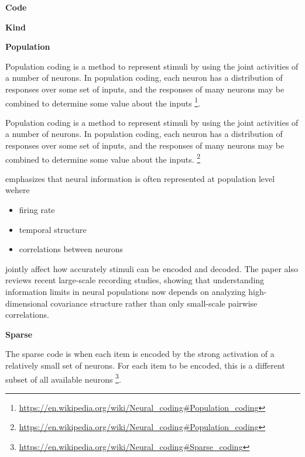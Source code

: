 \documentclass{book}
\providecommand{\ProjectDeepHeading}[2]{%
    \par\medskip\noindent\textbf{#2}\par\smallskip
}
\providecommand{\seeherefooter}[1]{\footnote{\url{#1}}}
\begin{document}
\ProjectDeepHeading{8}{Code}

\ProjectDeepHeading{9}{Kind}

\ProjectDeepHeading{10}{Population}


Population coding is a method to represent stimuli by using the joint activities of a number of neurons. In population coding, each neuron has a distribution of responses over some set of inputs, and the responses of many neurons may be combined to determine some value about the inputs \seeherefooter{https://en.wikipedia.org/wiki/Neural_coding\#Population_coding}.
    
    Population coding is a method to represent stimuli by using the joint activities of a number of neurons. In population coding, each neuron has a distribution of responses over some set of inputs, and the responses of many neurons may be combined to determine some value about the inputs.
    \seeherefooter{https://en.wikipedia.org/wiki/Neural_coding\#Population_coding}
    
    \cite{shimazaki-2025-neural-coding-foundational-concepts-statistical-formulations-and-recent-advances} emphasizes that neural information is often represented at population level wehere
    
    \begin{itemize}
        \item firing rate
        \item temporal structure
        \item correlations between neurons
    \end{itemize}
    jointly affect how accurately stimuli can be encoded and decoded. The paper also reviews recent large-scale recording studies, showing that understanding information limits in neural populations now depends on analyzing high-dimensional covariance structure rather than only small-scale pairwise correlations.
    \cite{shimazaki-2025-neural-coding-foundational-concepts-statistical-formulations-and-recent-advances}

\ProjectDeepHeading{10}{Sparse}


The sparse code is when each item is encoded by the strong activation of a relatively small set of neurons. For each item to be encoded, this is a different subset of all available neurons \seeherefooter{https://en.wikipedia.org/wiki/Neural_coding\#Sparse_coding}.
\end{document}
